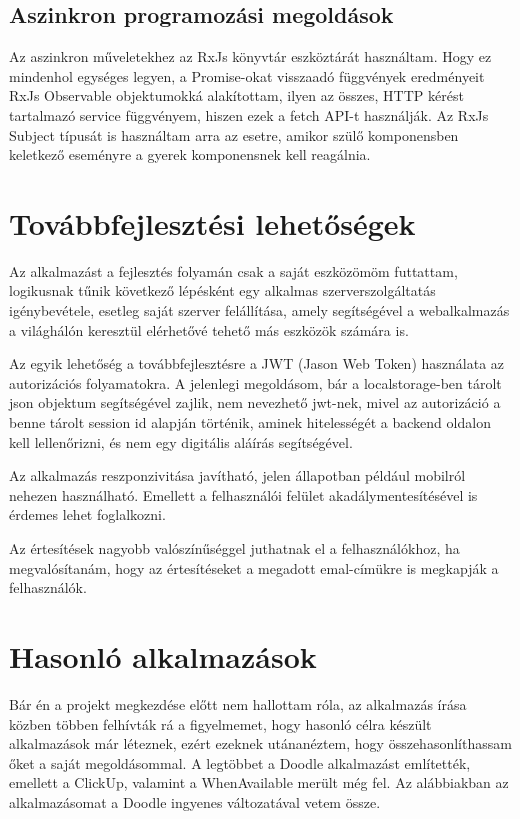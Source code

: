 \documentclass[a4paper,12pt]{report}
\theoremstyle{definition}
\theoremstyle{remark}
\begin{document}
\section{Aszinkron programozási megoldások}

Az aszinkron műveletekhez az RxJs könyvtár eszköztárát használtam. Hogy ez mindenhol egységes legyen, a Promise-okat visszaadó függvények eredményeit RxJs Observable objektumokká alakítottam, ilyen az összes, HTTP kérést tartalmazó service függvényem, hiszen ezek a fetch API-t használják. Az RxJs Subject típusát is használtam arra az esetre, amikor szülő komponensben keletkező eseményre a gyerek komponensnek kell reagálnia.
 
\chapter{Továbbfejlesztési lehetőségek}

Az alkalmazást a fejlesztés folyamán csak a saját eszközömöm futtattam, logikusnak tűnik következő lépésként egy alkalmas szerverszolgáltatás igénybevétele, esetleg saját szerver felállítása, amely segítségével a webalkalmazás a világhálón keresztül elérhetővé tehető más eszközök számára is.

Az egyik lehetőség a továbbfejlesztésre a JWT\cite{JWTwebsite} (Jason Web Token) használata az autorizációs folyamatokra. A jelenlegi megoldásom, bár a localstorage-ben tárolt json objektum segítségével zajlik, nem nevezhető jwt-nek, mivel az autorizáció a benne tárolt session id alapján történik, aminek hitelességét a backend oldalon kell lellenőrizni, és nem egy digitális aláírás segítségével.

Az alkalmazás reszponzivitása javítható, jelen állapotban például mobilról nehezen használható. Emellett a felhasználói felület akadálymentesítésével is érdemes lehet foglalkozni.

Az értesítések nagyobb valószínűséggel juthatnak el a felhasználókhoz, ha megvalósítanám, hogy az értesítéseket a megadott emal-címükre is megkapják a felhasználók.

\chapter{Hasonló alkalmazások}

Bár én a projekt megkezdése előtt nem hallottam róla, az alkalmazás írása közben többen felhívták rá a figyelmemet, hogy hasonló célra készült alkalmazások már léteznek, ezért ezeknek utánanéztem, hogy összehasonlíthassam őket a saját megoldásommal. A legtöbbet a Doodle alkalmazást említették, emellett a ClickUp, valamint a WhenAvailable merült még fel. Az alábbiakban az alkalmazásomat a Doodle\cite{DoodleWebsite} ingyenes változatával vetem össze.
\end{document}
